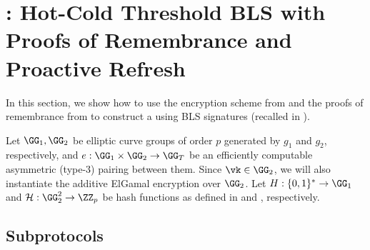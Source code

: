 \section[\sysname: Hot-Cold Threshold BLS with Proofs of Remembrance and Proactive Refresh]{\sysname: Hot-Cold Threshold BLS with\texorpdfstring{\\}{} Proofs of Remembrance and Proactive Refresh}\label{sec:bls-construction}

% 
In this section, we show how to use the encryption scheme from  and the proofs of remembrance from  to construct a \hcwl using BLS signatures (recalled in ). 

Let $\GG_1, \GG_2$ be elliptic curve groups of order $p$ generated by $g_1$ and $g_2$, respectively, and $e: \GG_1 \times \GG_2 \rightarrow \GG_T$ be an efficiently computable asymmetric (type-3) pairing between them. 
Since $\vk \in \GG_2$, we will also instantiate the additive ElGamal encryption over $\GG_2$. 
Let $\blshash: \{0, 1\}^* \rightarrow \GG_1$ and $\lhlhash: \GG_2^2 \rightarrow \ZZ_p$ be hash functions as defined in  and , respectively.

\subsection{Subprotocols}




